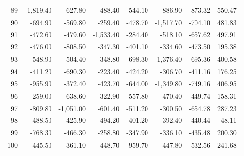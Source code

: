 \begin{longtable}{rrrrrrrr}
89 & -1,819.40 & -627.80 & -488.40 & -544.10 & -886.90 & -873.32 & 550.47  \\
90 & -694.90 & -569.80 & -259.40 & -478.70 & -1,517.70 & -704.10 & 481.83  \\
91 & -472.60 & -479.60 & -1,533.40 & -284.40 & -518.10 & -657.62 & 497.91  \\
92 & -476.00 & -808.50 & -347.30 & -401.10 & -334.60 & -473.50 & 195.38  \\
93 & -548.90 & -504.40 & -348.80 & -698.30 & -1,376.40 & -695.36 & 400.58  \\
94 & -411.20 & -690.30 & -223.40 & -424.20 & -306.70 & -411.16 & 176.25  \\
95 & -955.90 & -372.40 & -423.70 & -644.00 & -1,349.80 & -749.16 & 406.95  \\
96 & -259.00 & -638.60 & -322.90 & -557.80 & -470.40 & -449.74 & 158.31  \\
97 & -809.80 & -1,051.00 & -601.40 & -511.20 & -300.50 & -654.78 & 287.23  \\
98 & -488.50 & -425.90 & -494.20 & -401.20 & -392.40 & -440.44 & 48.11  \\
99 & -768.30 & -466.30 & -258.80 & -347.90 & -336.10 & -435.48 & 200.30  \\
100 & -445.50 & -361.10 & -448.70 & -959.70 & -447.80 & -532.56 & 241.68  \\

\end{longtable}


